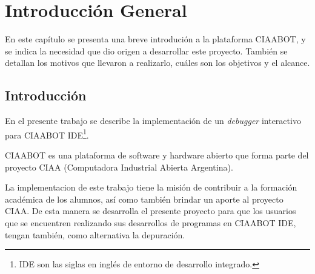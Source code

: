 
\chapter{Introducción General} %

\label{Chapter1} %
\label{IntroGeneral}
En este capítulo se presenta una breve introdución a la plataforma CIAABOT, y se
indica la necesidad que dio origen a desarrollar este proyecto. También se detallan
los motivos que llevaron a realizarlo, cuáles son los objetivos y el alcance.


\newcommand{\keyword}[1]{\textbf{#1}}
\newcommand{\tabhead}[1]{\textbf{#1}}
\newcommand{\code}[1]{\texttt{#1}}
\newcommand{\file}[1]{\texttt{\bfseries#1}}
\newcommand{\option}[1]{\texttt{\itshape#1}}
\newcommand{\grados}{$^{\circ}$}



\section{Introducción}
\label{Introducción}
En el presente trabajo se describe la implementación de un \emph{debugger} interactivo
para CIAABOT IDE\footnote{IDE son las siglas en inglés de entorno de desarrollo integrado.}.

CIAABOT es una plataforma de software y hardware abierto que forma parte del proyecto CIAA (Computadora Industrial Abierta Argentina)\citep{CIAA}. 


La implementacion de este trabajo tiene la misión de contribuir a la formación
académica de los alumnos, así como también brindar un aporte al proyecto CIAA.
De esta manera se desarrolla el presente proyecto para que los usuarios que se encuentren
realizando sus desarrollos de programas en CIAABOT IDE, tengan también, como alternativa la depuración.

